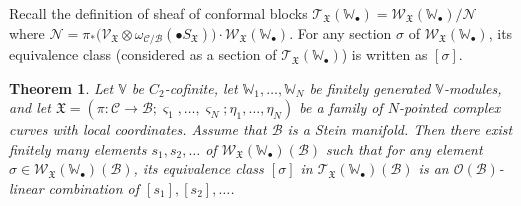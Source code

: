 \documentclass[12pt,a4paper,notitlepage]{report}
\theoremstyle{definition}
\theoremstyle{plain}
\newtheorem{thm}[df]{Theorem}
\newcommand{\fk}{\mathfrak}
\newcommand{\mc}{\mathcal}
\newcommand{\scr}{\mathscr}
\newcommand{\sgm}{\varsigma}
\newcommand{\blt}{\bullet}
\newcommand{\Vbb}{\mathbb V}
\newcommand{\Wbb}{\mathbb W}
\numberwithin{equation}{section}
\begin{document}
Recall the definition of sheaf of conformal blocks $\scr T_{\fk X}(\Wbb_\blt)=\scr W_{\fk X}(\Wbb_\blt)/\scr N$ where $\scr N=\pi_*\big(\scr V_{\fk X}\otimes\omega_{\mc C/\mc B}(\blt S_{\fk X})\big)\cdot \scr W_{\fk X}(\Wbb_\blt)$. For any section $\sigma$ of $\scr W_{\fk X}(\Wbb_\blt)$, its equivalence class (considered as a section of $\scr T_{\fk X}(\Wbb_\blt)$) is written as $[\sigma]$.

\begin{thm}\label{lb67}
Let $\Vbb$ be $C_2$-cofinite, let $\Wbb_1,\dots,\Wbb_N$ be finitely generated $\Vbb$-modules, and let $\fk X=(\pi:\mc C\rightarrow\mc B;\sgm_1,\dots,\sgm_N;\eta_1,\dots,\eta_N)$ be a family of $N$-pointed complex curves with local coordinates. Assume that $\mc B$ is a  Stein manifold. Then there exist finitely many elements $s_1,s_2,\dots$ of $\scr W_{\fk X}(\Wbb_\blt)(\mc B)$ such that  for any element $\sigma\in\scr W_{\fk X}(\Wbb_\blt)(\mc B)$, its equivalence class $[\sigma]$ in $\scr T_{\fk X}(\Wbb_\blt)(\mc B)$ is an $\scr O(\mc B)$-linear combination of $[s_1],[s_2],\dots$.
\end{thm}
\end{document}

